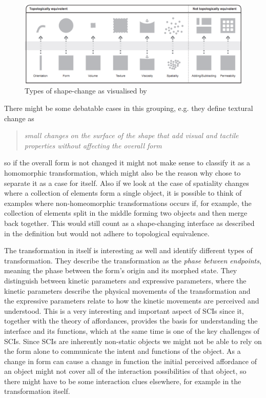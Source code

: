 \begin{figure}[h]
  \centering
  \includegraphics[width=0.9\linewidth]{figures/types-of-change}
	\caption{Types of shape-change as visualised by \citep{rasmussen2012shape}}
   \label{types-of-change}
\end{figure}

There might be some debatable cases in this grouping, e.g. they define textural change as
\begin{quotation}
  \emph{small changes on the surface of the shape that add visual and tactile properties without affecting the overall form}
\end{quotation} 
so if the overall form is not changed it might not make sense to classify it as a homomorphic transformation, which might also be the reason why \citeauthor{coelho2011shape} chose to separate it as a case for itself.
Also if we look at the case of spatiality changes where a collection of elements form a single object, it is possible to think of examples where non-homeomorphic transformations occurs if, for example, the collection of elements split in the middle forming two objects and then merge back together.
This would still count as a shape-changing interface as described in the definition but would not adhere to topological equivalence.   

The transformation in itself is interesting as well and \citeauthor{rasmussen2012shape} identify different types of transformation.
They describe the transformation as the \textit{phase between endpoints}, meaning the phase between the form's origin and its morphed state.
They distinguish between kinetic parameters and expressive parameters, where the kinetic parameters describe the physical movements of the transformation and the expressive parameters relate to how the kinetic movements are perceived and understood.
This is a very interesting and important aspect of SCIs since it, together with the theory of affordances, provides the basis for understanding the interface and its functions, which at the same time is one of the key challenges of SCIs.
Since SCIs are inherently non-static objects we might not be able to rely on the form alone to communicate the intent and functions of the object. As a change in form can cause a change in function the initial perceived affordance of an object might not cover all of the interaction possibilities of that object, so there might have to be some interaction clues elsewhere, for example in the transformation itself.


